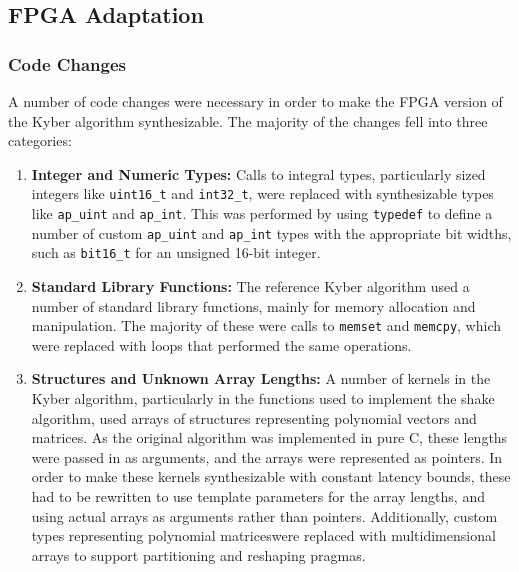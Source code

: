 
\subsection*{FPGA Adaptation}


\subsubsection*{Code Changes}

A number of code changes were necessary in order to make the FPGA version of the Kyber algorithm synthesizable. The majority of the changes fell into three categories:
\begin{enumerate}
  \item \textbf{Integer and Numeric Types:} Calls to integral types, particularly sized integers like \texttt{uint16\_t} and \texttt{int32\_t}, were replaced with synthesizable types like \texttt{ap\_uint} and \texttt{ap\_int}. This was performed by using \texttt{typedef} to define a number of custom \texttt{ap\_uint} and \texttt{ap\_int} types with the appropriate bit widths, such as \texttt{bit16\_t} for an unsigned 16-bit integer.
  \item \textbf{Standard Library Functions:} The reference Kyber algorithm used a number of standard library functions, mainly for memory allocation and manipulation. The majority of these were calls to \texttt{memset} and \texttt{memcpy}, which were replaced with loops that performed the same operations.
  \item \textbf{Structures and Unknown Array Lengths:} A number of kernels in the Kyber algorithm, particularly in the functions used to implement the shake algorithm, used arrays of structures representing polynomial vectors and matrices. As the original algorithm was implemented in pure C, these lengths were passed in as arguments, and the arrays were represented as pointers. In order to make these kernels synthesizable with constant latency bounds, these had to be rewritten to use template parameters for the array lengths, and using actual arrays as arguments rather than pointers. Additionally, custom types representing polynomial matriceswere replaced with multidimensional arrays to support partitioning and reshaping pragmas.
\end{enumerate}


